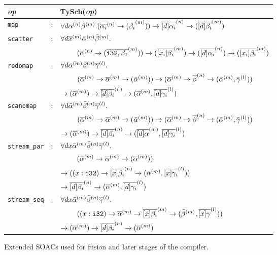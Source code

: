 \begin{figure}
\begin{tabular}{lcl}
\emph{op} & & \textrm{TySch}(\emph{op}) \\ \hline
  {\lstinline!map!} & : & $\forall d \bar{\alpha}^{(n)}\bar{\beta}^{(m)}. (\overline{\alpha_{i}}^{(n)} \rightarrow (\bar{\beta_{i}}^{(m)})) \rightarrow \overline{[d]\alpha_{i}}^{(n)} \rightarrow (\overline{[d]\beta_{i}}^{(m)})$ \\
  {\lstinline!scatter!} & : & $\forall d \overline{x}^{(m)} \bar{\alpha}^{(n)}\bar{\beta}^{(m)}.$\\
          & & ~~~~ $(\overline{\alpha}^{(n)} \rightarrow (\overline{\texttt{i32}, \beta_{1}}^{(m)})) \rightarrow (\overline{[x_{i}]\beta_{i}}^{(m)}) \rightarrow (\overline{[d]\alpha_i}^{(n)}) \rightarrow (\overline{[x_{i}]\beta_i}^{(m)})$\\
  {\lstinline!redomap!} & : & $\forall d \bar{\alpha}^{(m)}\bar{\beta}^{(n)}\overline{\gamma}^{(l)}.$\\
          & & ~~~~ $(\overline{\alpha}^{(m)} \rightarrow \overline{\alpha}^{(m)} \rightarrow (\bar{\alpha}^{(m)})) \rightarrow (\overline{\alpha}^{(m)} \rightarrow \overline{\beta}^{(n)} \rightarrow (\bar{\alpha}^{(m)}, \bar{\gamma}^{(l)}))$ \\
          & & $\rightarrow (\overline{\alpha}^{(m)}) \rightarrow \overline{[d]\beta_i}^{(n)} \rightarrow (\overline{\alpha}^{(m)},\overline{[d]\gamma_{i}}^{(l)})$ \\
  {\lstinline!scanomap!} & : & $\forall d \bar{\alpha}^{(m)}\bar{\beta}^{(n)}\overline{\gamma}^{(l)}.$\\
          & & ~~~~ $(\overline{\alpha}^{(m)} \rightarrow \overline{\alpha}^{(m)} \rightarrow (\bar{\alpha}^{(m)})) \rightarrow (\overline{\alpha}^{(m)} \rightarrow \overline{\beta}^{(n)} \rightarrow (\bar{\alpha}^{(m)}, \bar{\gamma}^{(l)}))$ \\
          & & $\rightarrow (\overline{\alpha}^{(m)}) \rightarrow \overline{[d]\beta_i}^{(n)} \rightarrow (\overline{[d]\alpha}^{(m)},\overline{[d]\gamma_{i}}^{(l)})$ \\
  {\lstinline!stream_par!} & : & $\forall d x \bar{\alpha}^{(m)}\bar{\beta}^{(n)}\overline{\gamma}^{(l)}.$\\
          & & ~~~~ $(\overline{\alpha}^{(m)} \rightarrow \overline{\alpha}^{(m)} \rightarrow (\overline{\alpha}^{(m)}))$ \\
          & & $\rightarrow ((x: \texttt{i32}) \rightarrow \overline{[x]\beta_i}^{(n)} \rightarrow (\bar{\alpha}^{(m)}, \overline{[x]\gamma_{i}}^{(l)}))$ \\
          & & $\rightarrow \overline{[d]\beta_i}^{(n)} \rightarrow (\overline{\alpha}^{(m)},\overline{[d]\gamma_{i}}^{(l)})$ \\
  {\lstinline!stream_seq!} & : & $\forall d x \bar{\alpha}^{(m)}\bar{\beta}^{(n)}\overline{\gamma}^{(l)}.$\\
          & & ~~~~ $((x: \texttt{i32}) \rightarrow \overline{\alpha}^{(m)} \rightarrow \overline{[x]\beta_i}^{(m)} \rightarrow (\bar{\beta}^{(m)}, \overline{[x]\gamma}^{(l)}))$ \\
          & & $\rightarrow (\overline{\alpha}^{(m)}) \rightarrow \overline{[d]\beta_i}^{(n)} \rightarrow (\overline{\alpha}^{(m)})$ \\

\end{tabular}
\caption{Extended SOACs used for fusion and later stages of the compiler.}
\label{fig:newSoacType}
\end{figure}

